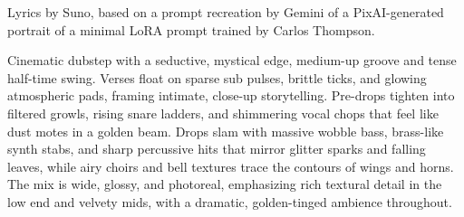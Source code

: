 

\begin{notes}
Lyrics by Suno, based on a prompt recreation by Gemini of a PixAI-generated portrait of a minimal LoRA prompt trained by Carlos Thompson.
\end{notes}
\begin{style}
Cinematic dubstep with a seductive, mystical edge, medium-up groove and tense half-time swing. %
Verses float on sparse sub pulses, brittle ticks, and glowing atmospheric pads, framing intimate, close-up storytelling. %
Pre-drops tighten into filtered growls, rising snare ladders, and shimmering vocal chops that feel like dust motes in a golden beam. %
Drops slam with massive wobble bass, brass-like synth stabs, and sharp percussive hits that mirror glitter sparks and falling leaves, while airy choirs and bell textures trace the contours of wings and horns. %
The mix is wide, glossy, and photoreal, emphasizing rich textural detail in the low end and velvety mids, with a dramatic, golden-tinged ambience throughout.
\end{style}

